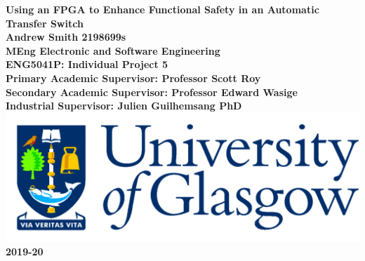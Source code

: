 \documentclass[12pt,titlepage,oneside]{book}
\begin{document}
\begin{titlepage}
\centering
\vspace*{3cm}  %
\bfseries\Large
Using an FPGA to Enhance Functional Safety in an Automatic Transfer Switch\\


\vspace{3cm}
\normalfont\large
Andrew Smith 2198699s\\
MEng Electronic and Software Engineering\\
\vspace{2cm}
ENG5041P: Individual Project 5\\

\vspace{2cm}
Primary Academic Supervisor: Professor Scott Roy\\
Secondary Academic Supervisor: Professor Edward Wasige\\
Industrial Supervisor: Julien Guilhemsang PhD\\
\vspace{1cm}
\includegraphics[scale=0.125]{images/GlaLogo.pdf}
\\
\vspace{1cm}
2019-20
\end{titlepage}
\frontmatter  %


%

\renewcommand{\contentsname}{Report Contents} %
\cleardoublepage
\tableofcontents
\listoftables
\listoffigures





\mainmatter %









%

\renewcommand\bibname{References}  %
\printbibliography %

\appendix


\backmatter  %
\end{document}

